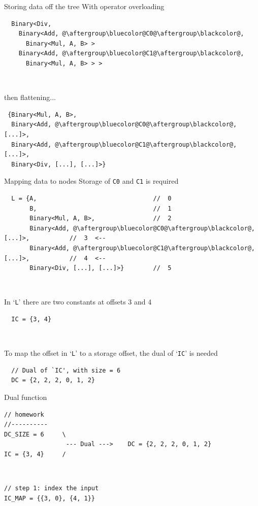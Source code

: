 \documentclass[xcolor=dvipsnames]{beamer}
\begin{document}
\begin{frame}[fragile]{Storing data off the tree}
With operator overloading
\begin{lstlisting}
  Binary<Div,
    Binary<Add, @\aftergroup\bluecolor@C0@\aftergroup\blackcolor@,
      Binary<Mul, A, B> >
    Binary<Add, @\aftergroup\bluecolor@C1@\aftergroup\blackcolor@,
      Binary<Mul, A, B> > >
\end{lstlisting}

~

then flattening...
\begin{lstlisting}
 {Binary<Mul, A, B>,
  Binary<Add, @\aftergroup\bluecolor@C0@\aftergroup\blackcolor@, [...]>,
  Binary<Add, @\aftergroup\bluecolor@C1@\aftergroup\blackcolor@, [...]>,
  Binary<Div, [...], [...]>}
\end{lstlisting}
\end{frame}


\begin{frame}[fragile]{Mapping data to nodes}
Storage of {\color{blue}\texttt{C0}} and {\color{blue}\texttt{C1}} is required
\begin{lstlisting}
  L = {A,                                //  0
       B,                                //  1
       Binary<Mul, A, B>,                //  2
       Binary<Add, @\aftergroup\bluecolor@C0@\aftergroup\blackcolor@, [...]>,           //  3  <--
       Binary<Add, @\aftergroup\bluecolor@C1@\aftergroup\blackcolor@, [...]>,           //  4  <--
       Binary<Div, [...], [...]>}        //  5
\end{lstlisting}

~

In `\texttt{L}' there are two constants at offsets 3 and 4
\begin{lstlisting}
  IC = {3, 4}
\end{lstlisting}

~

To map the offset in `\texttt{L}' to a storage offset, the dual of `\texttt{IC}' is needed
\begin{lstlisting}
  // Dual of `IC', with size = 6
  DC = {2, 2, 2, 0, 1, 2}
\end{lstlisting}
\end{frame}


\begin{frame}[fragile]{Dual function}
\begin{lstlisting}
// homework
//----------
DC_SIZE = 6     \
                 --- Dual --->    DC = {2, 2, 2, 0, 1, 2}
IC = {3, 4}     /
\end{lstlisting}

~

\begin{lstlisting}
// step 1: index the input
IC_MAP = {{3, 0}, {4, 1}}
\end{lstlisting}
\end{frame}
\end{document}
